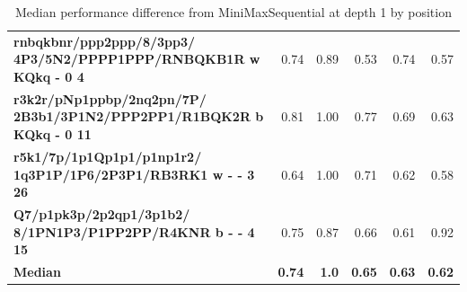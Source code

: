 \begin{table}[H]
{\begin{tabular}{|p{8cm}|*{5}{r|}}
\rowcolor[HTML]{FFFFFF}
\textbf{rnbqkbnr/ppp2ppp/8/3pp3/ 4P3/5N2/PPPP1PPP/RNBQKB1R w KQkq - 0 4}               & 0.74 & 0.89 & 0.53 & 0.74 & 0.57 \\

\rowcolor[HTML]{EFEFEF}
\textbf{r3k2r/pNp1ppbp/2nq2pn/7P/ 2B3b1/3P1N2/PPP2PP1/R1BQK2R b KQkq - 0 11}               & 0.81 & 1.00 & 0.77 & 0.69 & 0.63 \\

\rowcolor[HTML]{FFFFFF}
\textbf{r5k1/7p/1p1Qp1p1/p1np1r2/ 1q3P1P/1P6/2P3P1/RB3RK1 w - - 3 26}               & 0.64 & 1.00 & 0.71 & 0.62 & 0.58 \\

\rowcolor[HTML]{EFEFEF}
\textbf{Q7/p1pk3p/2p2qp1/3p1b2/ 8/1PN1P3/P1PP2PP/R4KNR b - - 4 15}               & 0.75 & 0.87 & 0.66 & 0.61 & 0.92 \\
\hline
\hline
\rowcolor[HTML]{FFFFFF}
\textbf{Median}               & \textbf{0.74} & \textbf{1.0} & \textbf{0.65} & \textbf{0.63} & \textbf{0.62} \\

            \hline
        \end{tabular}%
    }
    \caption{Median performance difference from MiniMaxSequential at depth 1 by position}
    \label{tab:median-performance-difference-from-minimaxsequential-at-depth-1-by-position}
\end{table}
